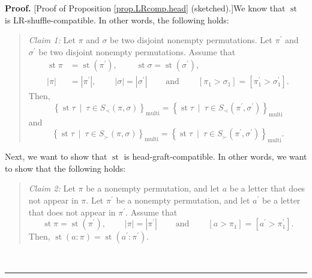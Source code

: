 \documentclass[numbers=enddot,12pt,final,onecolumn,notitlepage]{scrartcl}%
\theoremstyle{definition}
\newenvironment{statement}{\begin{quote}}{\end{quote}}
\newenvironment{proof}[1][Proof]{\noindent\textbf{#1.} }{\ \rule{0.5em}{0.5em}}
\newenvironment{verlong}{}{}
\begin{document}
\begin{verlong}
\begin{proof}
[Proof of Proposition \ref{prop.LRcomp.head} (sketched).]We know that
$\operatorname{st}$ is LR-shuffle-compatible. In other words, the following holds:

\begin{statement}
\textit{Claim 1:} Let $\pi$ and $\sigma$ be two disjoint nonempty
permutations. Let $\pi^{\prime}$ and $\sigma^{\prime}$ be two disjoint
nonempty permutations. Assume that%
\begin{align*}
\operatorname{st} \pi    &  =\operatorname{st}\left(
\pi^{\prime}\right)  ,\ \ \ \ \ \ \ \ \ \ \operatorname{st} \sigma
=\operatorname{st}\left(  \sigma^{\prime}\right)  ,\\
\left\vert \pi\right\vert  &  =\left\vert \pi^{\prime}\right\vert
,\ \ \ \ \ \ \ \ \ \ \left\vert \sigma\right\vert =\left\vert \sigma^{\prime
}\right\vert \ \ \ \ \ \ \ \ \ \ \text{and}\ \ \ \ \ \ \ \ \ \ \left[  \pi
_{1}>\sigma_{1}\right]  =\left[  \pi_{1}^{\prime}>\sigma_{1}^{\prime}\right]
.
\end{align*}
Then,
\[
\left\{  \operatorname{st} \tau   \ \mid\ \tau\in S_{\prec
}\left(  \pi,\sigma\right)  \right\}  _{\operatorname*{multi}}=\left\{
\operatorname{st} \tau   \ \mid\ \tau\in S_{\prec}\left(
\pi^{\prime},\sigma^{\prime}\right)  \right\}  _{\operatorname*{multi}}%
\]
and%
\[
\left\{  \operatorname{st} \tau   \ \mid\ \tau\in S_{\succ
}\left(  \pi,\sigma\right)  \right\}  _{\operatorname*{multi}}=\left\{
\operatorname{st} \tau   \ \mid\ \tau\in S_{\succ}\left(
\pi^{\prime},\sigma^{\prime}\right)  \right\}  _{\operatorname*{multi}}.
\]

\end{statement}

Next, we want to show that $\operatorname{st}$ is head-graft-compatible. In
other words, we want to show that the following holds:

\begin{statement}
\textit{Claim 2:} Let $\pi$ be a nonempty permutation, and let $a$ be a letter
that does not appear in $\pi$. Let $\pi^{\prime}$ be a nonempty permutation,
and let $a^{\prime}$ be a letter that does not appear in $\pi^{\prime}$.
Assume that%
\[
\operatorname{st} \pi   =\operatorname{st}\left(  \pi^{\prime
}\right)  ,\ \ \ \ \ \ \ \ \ \ \left\vert \pi\right\vert =\left\vert
\pi^{\prime}\right\vert \ \ \ \ \ \ \ \ \ \ \text{and}%
\ \ \ \ \ \ \ \ \ \ \left[  a>\pi_{1}\right]  =\left[  a^{\prime}>\pi
_{1}^{\prime}\right]  .
\]
Then, $\operatorname{st}\left(  a:\pi\right)  =\operatorname{st}\left(
a^{\prime}:\pi^{\prime}\right)  $.
\end{statement}


\end{proof}
\end{verlong}
\end{document}
